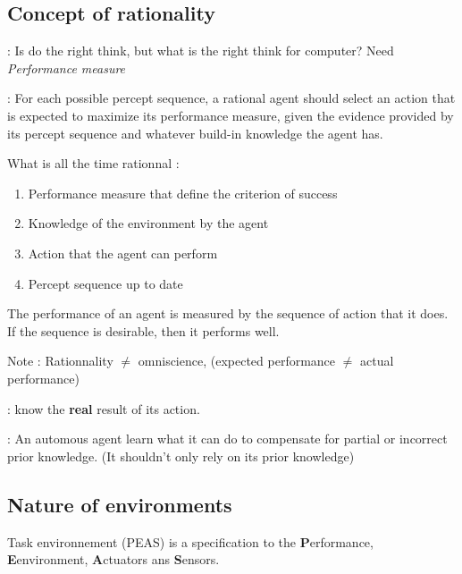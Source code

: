 \subsection{Concept of rationality}
\begin{description}

    \item[Rationality] : Is do the right think, but what is the
        right think for computer? Need \textit{Performance measure}

    \item[Rationnal  agent]  : For  each  possible  percept sequence,  a
    rational agent should select an  action that is expected to maximize
    its performance measure, given the  evidence provided by its percept
    sequence and whatever build-in knowledge the agent has.
    

   \item What is all the time rationnal :
        \begin{enumerate}
            \item Performance measure that define the criterion of success
            \item Knowledge of the environment by the agent
            \item Action that the agent can perform
            \item Percept sequence up to date
        \end{enumerate}
	
    \item The performance of an agent is measured by the sequence of action that it does. If the sequence is
    		desirable, then it performs well.
    \item Note : Rationnality $\neq$ omniscience, (expected performance $\neq$ actual performance)

    \item[Omniscience agent] : know the \textbf{real} result of its action.

    \item[Autonomy] :  An automous agent learn what it can do to compensate for partial or incorrect prior
    knowledge. (It shouldn't only rely on its prior knowledge)

\end{description}


\subsection{Nature of environments}
Task environnement (PEAS) is a specification to the \textbf{P}erformance, 
\textbf{E}environment, \textbf{A}ctuators ans \textbf{S}ensors.

